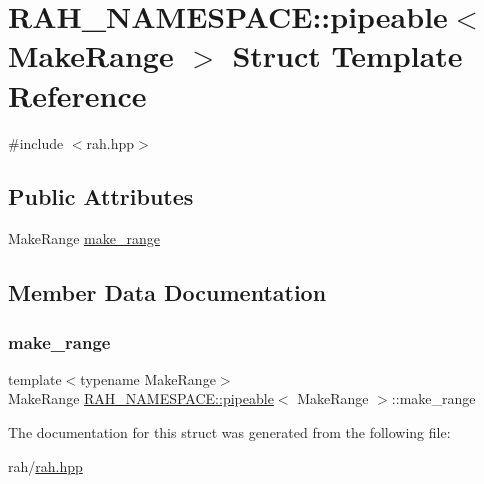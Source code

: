 \hypertarget{struct_r_a_h___n_a_m_e_s_p_a_c_e_1_1pipeable}{}\section{R\+A\+H\+\_\+\+N\+A\+M\+E\+S\+P\+A\+CE\+::pipeable$<$ Make\+Range $>$ Struct Template Reference}
\label{struct_r_a_h___n_a_m_e_s_p_a_c_e_1_1pipeable}


{\ttfamily \#include $<$rah.\+hpp$>$}

\subsection*{Public Attributes}
\begin{DoxyCompactItemize}
\item 
Make\+Range \mbox{\hyperlink{struct_r_a_h___n_a_m_e_s_p_a_c_e_1_1pipeable_a8ddd01c23e163d214268eef1e2ade808}{make\+\_\+range}}
\end{DoxyCompactItemize}


\subsection{Member Data Documentation}
\mbox{\label{struct_r_a_h___n_a_m_e_s_p_a_c_e_1_1pipeable_a8ddd01c23e163d214268eef1e2ade808}} 
\subsubsection{\texorpdfstring{make\_range}{make\_range}}
{\footnotesize\ttfamily template$<$typename Make\+Range$>$ \\
Make\+Range \mbox{\hyperlink{struct_r_a_h___n_a_m_e_s_p_a_c_e_1_1pipeable}{R\+A\+H\+\_\+\+N\+A\+M\+E\+S\+P\+A\+C\+E\+::pipeable}}$<$ Make\+Range $>$\+::make\+\_\+range}



The documentation for this struct was generated from the following file\+:\begin{DoxyCompactItemize}
\item 
rah/\mbox{\hyperlink{rah_8hpp}{rah.\+hpp}}\end{DoxyCompactItemize}

